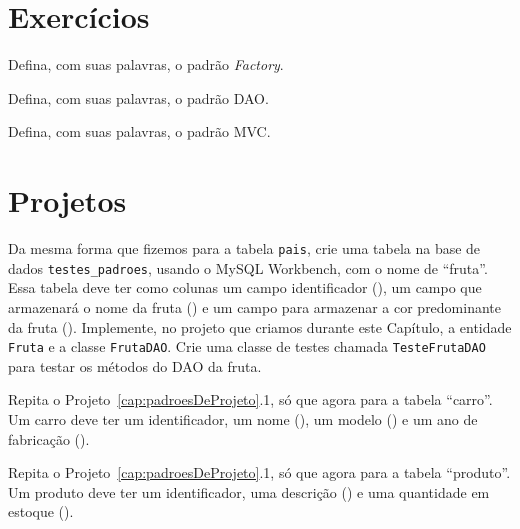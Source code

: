 \section{Exercícios}

\begin{exercicioSemArquivo}{}{}{}
    Defina, com suas palavras, o padrão \textit{Factory}.
\end{exercicioSemArquivo}

\begin{exercicioSemArquivo}{}{}{}
    Defina, com suas palavras, o padrão DAO.
\end{exercicioSemArquivo}

\begin{exercicioSemArquivo}{}{}{}
    Defina, com suas palavras, o padrão MVC.
\end{exercicioSemArquivo}


\section{Projetos}

\begin{projetoSemArquivo}{}{}{}
    Da mesma forma que fizemos para a tabela \texttt{pais}, crie uma tabela na base de dados \texttt{testes\_padroes}, usando o MySQL Workbench, com o nome de ``fruta''. Essa tabela deve ter como colunas um campo identificador (), um campo que armazenará o nome da fruta () e um campo para armazenar a cor predominante da fruta (). Implemente, no projeto que criamos durante este Capítulo, a entidade \texttt{Fruta} e a classe \texttt{FrutaDAO}. Crie uma classe de testes chamada \texttt{TesteFrutaDAO} para testar os métodos do DAO da fruta. 
\end{projetoSemArquivo}

\begin{projetoSemArquivo}{}{}{}
    Repita o Projeto~\ref{cap:padroesDeProjeto}.1, só que agora para a tabela ``carro''. Um carro deve ter um identificador, um nome (), um modelo () e um ano de fabricação ().
\end{projetoSemArquivo}

\begin{projetoSemArquivo}{}{}{}
    Repita o Projeto~\ref{cap:padroesDeProjeto}.1, só que agora para a tabela ``produto''. Um produto deve ter um identificador, uma descrição () e uma quantidade em estoque ().
\end{projetoSemArquivo}


